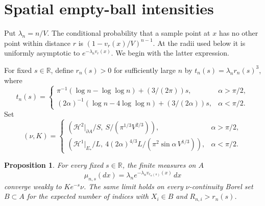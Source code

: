 \documentclass[11pt]{article}
\newtheorem{proposition}[theorem]{Proposition}
\newcommand{\HH}{\mathcal H}
\begin{document}
\section{Spatial empty-ball intensities}

Put $\lambda_n=n/V$. The conditional probability that a sample point
at $x$ has no other point within distance $r$ is
$(1-v_r(x)/V)^{n-1}$. At the radii used below it is uniformly asymptotic
to $e^{-\lambda_nv_r(x)}$. We begin with the latter expression.

For fixed $s\in\mathbb R$, define $r_n(s)>0$ for sufficiently large $n$
by $t_n(s)=\lambda_nr_n(s)^3$, where
\begin{equation}\label{eq:thresholds}
 t_n(s)=
 \begin{cases}
  \pi^{-1}(\log n-\log\log n)+(3/(2\pi))s,&\alpha>\pi/2,\\[1mm]
  (2\alpha)^{-1}(\log n-4\log\log n)+(3/(2\alpha))s,&\alpha<\pi/2.
 \end{cases}
\end{equation}
Set
\begin{equation}\label{eq:weights}
 (\nu,K)=
 \begin{cases}
  \left(\HH^2|_{\partial A}/S,\ S/(\pi^{1/3}V^{2/3})\right),&\alpha>\pi/2,\\[1mm]
  \left(\HH^1|_{E_*}/L,\ 4(2\alpha)^{4/3}L/(\pi^2\sin\alpha\,V^{1/3})\right),&\alpha<\pi/2.
 \end{cases}
\end{equation}

\begin{proposition}\label{prop:intensity}
For every fixed $s\in\mathbb R$, the finite measures on $A$
\[
 \mu_{n,s}(dx)=\lambda_ne^{-\lambda_nv_{r_n(s)}(x)}\,dx
\]
converge weakly to $Ke^{-s}\nu$. The same limit holds on every
$\nu$-continuity Borel set $B\subset A$ for the expected number of indices
with $X_i\in B$ and $R_{n,i}>r_n(s)$.
\end{proposition}
\end{document}
